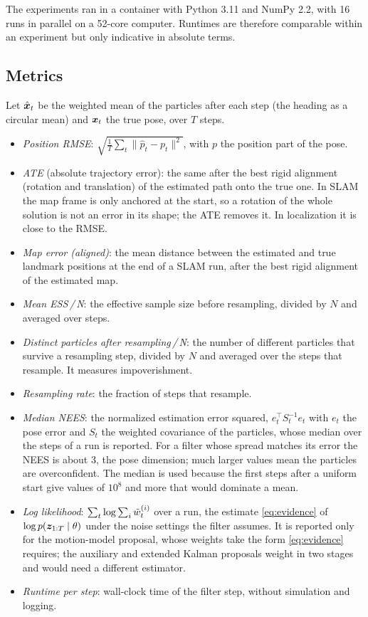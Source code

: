 The experiments ran in a container with Python 3.11 and NumPy 2.2, with 16 runs in parallel on a 52-core computer.
Runtimes are therefore comparable within an experiment but only indicative in absolute terms.

\subsection{Metrics}

Let $\hat{\bm{x}}_t$ be the weighted mean of the particles after each step (the heading as a circular mean) and $\bm{x}_t$ the
true pose, over $T$ steps.
\begin{itemize}
  \item \emph{Position RMSE}: $\sqrt{\frac{1}{T} \sum_t \lVert \hat{p}_t - p_t \rVert^2}$, with $p$ the position part of
        the pose.
  \item \emph{ATE} (absolute trajectory error): the same after the best rigid alignment (rotation and translation)
        of the estimated path onto the true one. In SLAM the map frame is only anchored at the start, so a rotation
        of the whole solution is not an error in its shape; the ATE removes it. In localization it is close to the
        RMSE.
  \item \emph{Map error (aligned)}: the mean distance between the estimated and true landmark positions at the end of
        a SLAM run, after the best rigid alignment of the estimated map.
  \item \emph{Mean ESS\,/\,N}: the effective sample size before resampling, divided by $N$ and averaged over steps.
  \item \emph{Distinct particles after resampling\,/\,N}: the number of different particles that survive a
        resampling step, divided by $N$ and averaged over the steps that resample. It measures impoverishment.
  \item \emph{Resampling rate}: the fraction of steps that resample.
  \item \emph{Median NEES}: the normalized estimation error squared, $e_t^\top S_t^{-1} e_t$ with $e_t$ the pose error
        and $S_t$ the weighted covariance of the particles, whose median over the steps of a run is reported. For a
        filter whose spread matches its error the NEES is about 3, the pose dimension; much larger values mean the
        particles are overconfident. The median is used because the first steps after a uniform start give values
        of $10^8$ and more that would dominate a mean.
  \item \emph{Log likelihood}: $\sum_t \log \sum_i \tilde{w}_t^{(i)}$ over a run, the estimate
        \eqref{eq:evidence} of $\log p(\bm{z}_{1:T} \mid \theta)$ under the noise settings the filter assumes. It is
        reported only for the motion-model proposal, whose weights take the form \eqref{eq:evidence} requires; the
        auxiliary and extended Kalman proposals weight in two stages and would need a different estimator.
  \item \emph{Runtime per step}: wall-clock time of the filter step, without simulation and logging.
\end{itemize}

